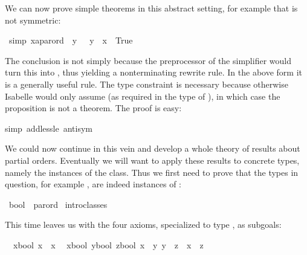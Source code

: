 \begin{isabellebody}
\begin{isamarkuptext}
We can now prove simple theorems in this abstract setting, for example
that \isa{{\isacharless}{\isacharless}} is not symmetric:%
\end{isamarkuptext}%
\ {\isacharbrackleft}simp{\isacharbrackright}{\isacharcolon}\ {\isachardoublequote}{\isacharparenleft}x{\isacharcolon}{\isacharcolon}{\isacharprime}a{\isacharcolon}{\isacharcolon}parord{\isacharparenright}\ {\isacharless}{\isacharless}\ y\ {\isasymLongrightarrow}\ {\isacharparenleft}{\isasymnot}\ y\ {\isacharless}{\isacharless}\ x{\isacharparenright}\ {\isacharequal}\ True{\isachardoublequote}%
\begin{isamarkuptxt}%
\noindent
The conclusion is not simply  because the preprocessor
of the simplifier would turn this into , thus yielding
a nonterminating rewrite rule. In the above form it is a generally useful
rule.
The type constraint is necessary because otherwise Isabelle would only assume
 (as required in the type of \isa{{\isacharless}{\isacharless}}), in
which case the proposition is not a theorem.  The proof is easy:%
\end{isamarkuptxt}%
simp\ add{\isacharcolon}less{\isacharunderscore}le\ antisym{\isacharparenright}%
\begin{isamarkuptext}%
We could now continue in this vein and develop a whole theory of
results about partial orders. Eventually we will want to apply these results
to concrete types, namely the instances of the class. Thus we first need to
prove that the types in question, for example , are indeed
instances of :%
\end{isamarkuptext}%
\ bool\ {\isacharcolon}{\isacharcolon}\ parord\isanewline
{}\ intro{\isacharunderscore}classes%
\begin{isamarkuptxt}%
\noindent
This time  leaves us with the four axioms,
specialized to type , as subgoals:
\begin{isabelle}%
\ {}{\isachardot}\ {\isasymAnd}x{\isasymColon}bool{\isachardot}\ x\ {\isacharless}{\isacharless}{\isacharequal}\ x\isanewline
\ {}{\isachardot}\ {\isasymAnd}{\isacharparenleft}x{\isasymColon}bool{\isacharparenright}\ {\isacharparenleft}y{\isasymColon}bool{\isacharparenright}\ z{\isasymColon}bool{\isachardot}\ {\isasymlbrakk}x\ {\isacharless}{\isacharless}{\isacharequal}\ y{\isacharsemicolon}\ y\ {\isacharless}{\isacharless}{\isacharequal}\ z{\isasymrbrakk}\ {\isasymLongrightarrow}\ x\ {\isacharless}{\isacharless}{\isacharequal}\ z\isanewline

\end{isabelle}
\end{isamarkuptxt}
\end{isabellebody}
